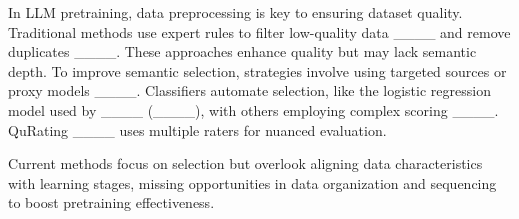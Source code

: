 

In LLM pretraining, data preprocessing is key to ensuring dataset quality. Traditional methods use expert rules to filter low-quality data ____ and remove duplicates ____. These approaches enhance quality but may lack semantic depth. To improve semantic selection, strategies involve using targeted sources or proxy models ____. Classifiers automate selection, like the logistic regression model used by ____ (____), with others employing complex scoring ____. QuRating ____ uses multiple raters for nuanced evaluation.

Current methods focus on selection but overlook aligning data characteristics with learning stages, missing opportunities in data organization and sequencing to boost pretraining effectiveness.